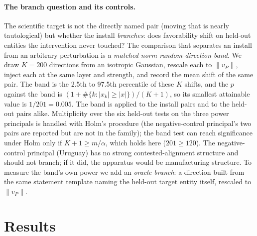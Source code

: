 \documentclass{article}
\newcommand{\Model}{\ModelA}
\begin{document}
\paragraph{The branch question and its controls.}
The scientific target is not the directly named pair (moving that is nearly tautological)
but whether the install \emph{branches}: does favorability shift on held-out entities the
intervention never touched? The comparison that separates an install from an arbitrary perturbation is
a \emph{matched-norm random-direction band}. We draw $K{=}200$ directions from an isotropic Gaussian,
rescale each to $\lVert v_P\rVert$, inject each at the same layer and strength, and record the mean shift of the
same pair. The band is the 2.5th to 97.5th percentile of these $K$ shifts, and the $p$ against the band is
$(1+\#\{k:|x_k|\ge|x|\})/(K+1)$, so its smallest attainable value is $1/201{=}0.005$. The band is applied to the install pairs and to the
held-out pairs alike. Multiplicity over the six held-out tests on the three power principals is handled with Holm's procedure
(the negative-control principal's two pairs are reported but are not in the family); the band test can reach significance under Holm
only if $K{+}1\ge m/\alpha$, which holds here ($201\ge120$). The negative-control principal (Uruguay) has no strong
contested-alignment structure and should not branch; if it did, the apparatus would be manufacturing structure.
To measure the band's own power we add an \emph{oracle branch}: a direction built from the same statement
template naming the held-out target entity itself, rescaled to $\lVert v_P\rVert$.

\section{Results}
\label{sec:results}

\begin{table}[t]
\centering
\scriptsize
\caption{Real \Model{} audit ($\ell{=}10$, $\alpha{=}6$, $K{=}200$). All four install pairs and all eight held-out pairs are shown. Shifts
are steered minus clean favor. Holm adjustment is over the six held-out tests on the three power principals; the two Uruguay pairs are
the negative control. ``Random band'' is the 95\% interval of the $K$ matched-norm random directions. No effect, install or branch,
lies outside its band ($p$ vs band $\ge$ \cInstBandPMin{} in every row).}
\label{tab:main}
\setlength{\tabcolsep}{4pt}
\mainTableA
\end{table}
\end{document}
